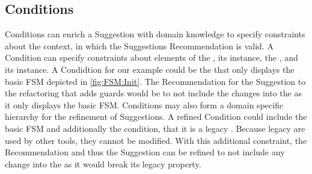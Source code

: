 \subsection{Conditions}
\label{sec:Conditions}
\textsf{Condition}s can enrich a \textsf{Suggestion} with domain knowledge to specify constraints about the context, in which the \textsf{Suggestion}s \textsf{Recommendation} is valid. A \textsf{Condition} can specify constraints about elements of the \metamodel, its instance, the \viewtype \metamodel, and its instance. A \textsf{Condidtion} for our example could be the \viewtype that only displays the basic \textsf{FSM} depicted in \cref{fig:FSM:Init}. The \textsf{Recommendation} for the \textsf{Suggestion} to the refactoring that adds guards would be to not include the \metamodel changes into the \viewtype as it only displays the basic \textsf{FSM}. \textsf{Conditions} may also form a domain specific hierarchy for the refinement of \textsf{Suggestion}s. A refined \textsf{Condition} could include the basic \textsf{FSM} \viewtype and additionally the condition, that it is a legacy \viewtype. Because legacy \viewtypes are used by other tools, they cannot be modified. With this additional constraint, the \textsf{Recommendation} and thus the \textsf{Suggestion} can be refined to not include any \metamodel change into the \viewtype as it would break its legacy property.

